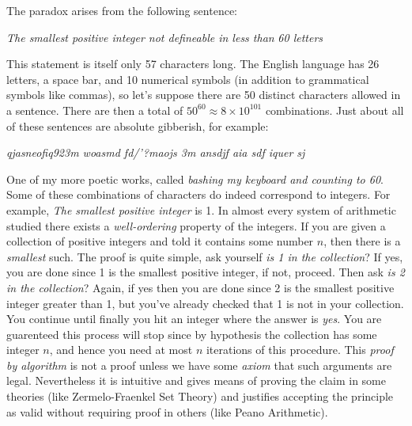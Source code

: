         The paradox arises from the following sentence:
        \begin{center}
            \textit{The smallest positive integer not defineable in less than}
            \textit{60 letters}
        \end{center}
        This statement is itself only 57 characters long. The English language
        has 26 letters, a space bar, and 10 numerical symbols (in addition to
        grammatical symbols like commas), so let's suppose there are 50 distinct
        characters allowed in a sentence. There are then a total of
        $50^{60}\approx{8}\times{10}^{101}$ combinations. Just about all of
        these sentences are absolute gibberish, for example:
        \begin{center}
            \textit{qjasneofiq923m woasmd fd/'?maojs 3m ansdjf aia sdf iquer sj}
        \end{center}
        One of my more poetic works, called
        \textit{bashing my keyboard and counting to 60}. Some of these
        combinations of characters do indeed correspond to integers. For
        example, \textit{The smallest positive integer} is 1. In almost every
        system of arithmetic studied there exists a \textit{well-ordering}%
         property of the integers. If you are given a
        collection of positive integers and told it contains some number $n$,
        then there is a \textit{smallest} such. The proof is quite simple, ask
        yourself \textit{is 1 in the collection}? If yes, you are done since 1
        is the smallest positive integer, if not, proceed. Then ask
        \textit{is 2 in the collection}? Again, if yes then you are done since
        2 is the smallest positive integer greater than 1, but you've already
        checked that 1 is not in your collection. You continue until finally you
        hit an integer where the answer is \textit{yes}. You are guarenteed this
        process will stop since by hypothesis the collection has some integer
        $n$, and hence you need at most $n$ iterations of this procedure. This
        \textit{proof by algorithm} is not a proof unless we have some
        \textit{axiom} that such arguments are legal. Nevertheless it is
        intuitive and gives means of proving the claim in some theories (like
        Zermelo-Fraenkel Set Theory) and justifies accepting the principle as
        valid without requiring proof in others (like Peano Arithmetic).
        \par\hfill\par
